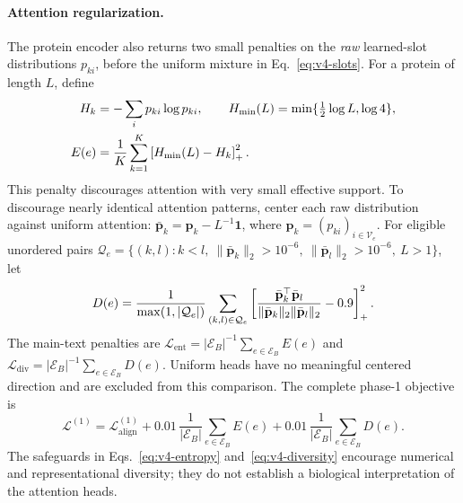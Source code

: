 \paragraph{Attention regularization.}
The protein encoder also returns two small penalties on the \emph{raw}
learned-slot distributions $p_{ki}$, before the uniform mixture in
Eq.~\eqref{eq:v4-slots}. For a protein of length $L$, define
\begin{align}
  H_k&=-\sum_i p_{ki}\log p_{ki},\qquad
  H_{\min}(L)=\min\{\tfrac12\log L,\log4\},\\
  E(e)&=\frac1K\sum_{k=1}^{K}\left[H_{\min}(L)-H_k\right]_{+}^{2}.
  \label{eq:v4-entropy}
\end{align}
This penalty discourages attention with very small effective support. To
discourage nearly identical attention patterns, center each raw distribution
against uniform attention: $\bar{\mathbf{p}}_k=\mathbf{p}_k-L^{-1}\mathbf 1$,
where $\mathbf{p}_k=(p_{ki})_{i\in\mathcal V_e}$. For eligible
unordered pairs $\mathcal Q_e=\{(k,l):k<l,\ \|\bar{\mathbf{p}}_k\|_2>10^{-6},
\ \|\bar{\mathbf{p}}_l\|_2>10^{-6},\ L>1\}$, let
\begin{equation}
  D(e)=\frac{1}{\max(1,|\mathcal Q_e|)}
     \sum_{(k,l)\in\mathcal Q_e}
       \left[\frac{\bar{\mathbf{p}}_k^\top\bar{\mathbf{p}}_l}
                         {\|\bar{\mathbf{p}}_k\|_2\|\bar{\mathbf{p}}_l\|_2}-0.9\right]_{+}^{2}.
  \label{eq:v4-diversity}
\end{equation}
The main-text penalties are $\mathcal L_{\mathrm{ent}}=|\mathcal E_B|^{-1}
\sum_{e\in\mathcal E_B}E(e)$ and $\mathcal L_{\mathrm{div}}=|\mathcal E_B|^{-1}
\sum_{e\in\mathcal E_B}D(e)$. Uniform heads have no meaningful centered direction and are excluded from
this comparison. The complete phase-1 objective is
\begin{equation}
  \boxed{\mathcal L^{(1)}=
      \mathcal L_{\mathrm{align}}^{(1)}
      +0.01\,\frac{1}{|\mathcal E_B|}\sum_{e\in\mathcal E_B}E(e)
      +0.01\,\frac{1}{|\mathcal E_B|}\sum_{e\in\mathcal E_B}D(e).}
  \label{eq:v4-phase1-total}
\end{equation}
The safeguards in Eqs.~\eqref{eq:v4-entropy}
and~\eqref{eq:v4-diversity} encourage numerical and representational diversity;
they do not establish a biological interpretation of the attention heads.

